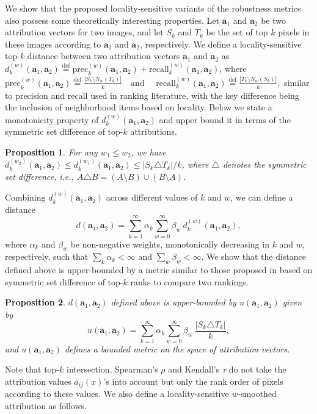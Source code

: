 \documentclass[letterpaper]{article} %
\newtheorem{prop}{Proposition}
\def\ba{\mathbf{a}}
\newcommand{\size}[1]{\left|#1\right|}
\begin{document}
We show that the proposed locality-sensitive variants of the robustness metrics also possess some theoretically interesting properties. Let $\ba_{1}$ and $\ba_{2}$ be two attribution vectors for two images, and let $S_{k}$ and $T_{k}$ be the set of top $k$ pixels in these images according to $\ba_{1}$ and $\ba_{2}$, respectively. We define a locality-sensitive top-$k$ distance between two attribution vectors $\ba_{1}$ and $\ba_{2}$ as $d_{k}^{(w)}(\ba_{1}, \ba_{2})\overset{\text{def}}{=} \text{prec}_{k}^{(w)}(\ba_{1}, \ba_{2}) + \text{recall}_{k}^{(w)}(\ba_{1}, \ba_{2})$, where
$
\text{prec}_{k}^{(w)}(\ba_{1}, \ba_{2}) \overset{\text{def}}{=} \frac{\size{S_{k} \setminus N_{w}(T_{k})}}{k} \quad \text{and}
$
$
\quad \text{recall}_{k}^{(w)}(\ba_{1}, \ba_{2}) \overset{\text{def}}{=} \frac{\size{T_{k} \setminus N_{w}(S_{k})}}{k},
$
similar to precision and recall used in ranking literature, with the key difference being the inclusion of neighborhood items based on locality. Below we state a monotonicity property of $d_{k}^{(w)}(\ba_{1}, \ba_{2})$ and upper bound it in terms of the symmetric set difference of top-$k$ attributions.
\begin{prop} \label{prop:monotone}
For any $w_{1} \leq w_{2}$, we have $d_{k}^{(w_{2})}(\ba_{1}, \ba_{2}) \leq d_{k}^{(w_{1})}(\ba_{1}, \ba_{2}) \leq \size{S_{k} \triangle T_{k}}/k$, where $\triangle$ denotes the symmetric set difference, i.e., $A \triangle B = (A \setminus B) \cup (B \setminus A)$.
\end{prop}
Combining $d_{k}^{(w)}(\ba_{1}, \ba_{2})$ across different values of $k$ and $w$, we can define a distance
\[
d(\ba_{1}, \ba_{2}) = \sum_{k=1}^{\infty} \alpha_{k} \sum_{w=0}^{\infty} \beta_{w}~ d_{k}^{(w)}(\ba_{1}, \ba_{2}),
\]
where $\alpha_{k}$ and $\beta_{w}$ be non-negative weights, monotonically decreasing in $k$ and $w$, respectively, such that $\sum_{k} \alpha_{k} < \infty$ and $\sum_{w} \beta_{w} < \infty$. We show that the distance defined above is upper-bounded by a metric similar to those proposed in \cite{fagin2003comparing} based on symmetric set difference of top-$k$ ranks to compare two rankings.
\begin{prop} \label{prop:metric}
$d(\ba_{1}, \ba_{2})$ defined above is upper-bounded by $u(\ba_{1}, \ba_{2})$ given by
\[
u(\ba_{1}, \ba_{2}) = \sum_{k=1}^{\infty} \alpha_{k} \sum_{w=0}^{\infty} \beta_{w}~ \frac{\size{S_{k} \triangle T_{k}}}{k},
\]
and $u(\ba_{1}, \ba_{2})$ defines a bounded metric on the space of attribution vectors.
\end{prop}
Note that top-$k$ intersection, Spearman's $\rho$ and Kendall's $\tau$ do not take the attribution values $a_{ij}(x)$'s into account but only the rank order of pixels according to these values. We also define a locality-sensitive $w$-smoothed attribution as follows.
\end{document}
